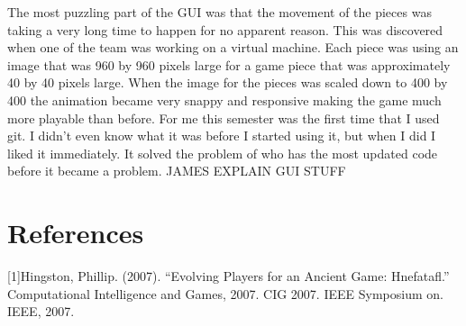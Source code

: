 \documentclass{article}
\begin{document}
	The most puzzling part of the GUI was that the movement of the pieces was taking a very long time to happen for no apparent reason. This was discovered when one of the team was working on a virtual machine. Each piece was using an image that was 960 by 960 pixels large for a game piece that was approximately 40 by 40 pixels large. When the image for the pieces was scaled down to 400 by 400 the animation became very snappy and responsive making the game much more playable than before. 
	For me this semester was the first time that I used git. I didn't even know what it was before I started using it, but when I did I liked it immediately. It solved the problem of who has the most updated code before it became a problem. 
	JAMES EXPLAIN GUI STUFF


\section{References}
[1]Hingston, Phillip. (2007). “Evolving Players for an Ancient Game: Hnefatafl.” Computational Intelligence and Games, 2007. CIG 2007. IEEE Symposium on. IEEE, 2007.
\end{document}
